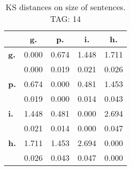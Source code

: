 \begin{table}[h!]
\begin{center}
\begin{tabular}{| l || c | c | c | c |}\hline
 & {\bf g.} & {\bf p.} & {\bf i.} & {\bf h.} \\\hline\hline
{\bf g.} & 0.000 & 0.674 & 1.448 & 1.711 \\
{\bf } & 0.000 & 0.019 & 0.021 & 0.026 \\\hline
{\bf p.} & 0.674 & 0.000 & 0.481 & 1.453 \\
{\bf } & 0.019 & 0.000 & 0.014 & 0.043 \\\hline
{\bf i.} & 1.448 & 0.481 & 0.000 & 2.694 \\
{\bf } & 0.021 & 0.014 & 0.000 & 0.047 \\\hline
{\bf h.} & 1.711 & 1.453 & 2.694 & 0.000 \\
{\bf } & 0.026 & 0.043 & 0.047 & 0.000 \\\hline
\end{tabular}
\caption{KS distances on size of sentences. TAG: 14}
\end{center}
\end{table}